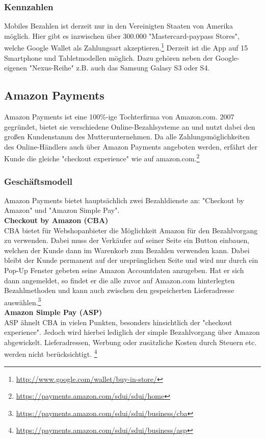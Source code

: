 \subsubsection{ Kennzahlen}
Mobiles Bezahlen ist derzeit nur in den Vereinigten Staaten von Amerika möglich. Hier gibt es inzwischen über 300.000 "Mastercard-paypass Stores", welche Google Wallet als Zahlungsart akzeptieren.\footnote{\url{http://www.google.com/wallet/buy-in-store/}}
Derzeit ist die App auf 15 Smartphone und Tabletmodellen möglich. Dazu gehören neben der Google-eigenen "Nexus-Reihe" z.B. auch das Samsung Galasy S3 oder S4. 

\subsection{Amazon Payments}
Amazon Payments ist eine 100\%-ige Tochterfirma von Amazon.com. 2007 gegründet, bietet sie verschiedene Online-Bezahlsysteme an und nutzt dabei den großen Kundenstamm des Mutterunternehmen. Da alle Zahlungsmöglichkeiten des Online-Händlers auch über Amazon Payments angeboten werden, erfährt der Kunde die gleiche "checkout experience" wie auf amazon.com.\footnote{\url{https://payments.amazon.com/sdui/sdui/home}}

\subsubsection{ Geschäftsmodell}
Amazon Payments bietet hauptsächlich zwei Bezahldienste an: "Checkout by Amazon" und "Amazon Simple Pay".\\

\textbf{Checkout by Amazon (CBA)}\\
CBA bietet für Webshopanbieter die Möglichkeit Amazon für den Bezahlvorgang zu verwenden. Dabei muss der Verkäufer auf seiner Seite ein Button einbauen, welchen der Kunde dann im Warenkorb zum Bezahlen verwenden kann. Dabei bleibt der Kunde permanent auf der ursprünglichen Seite und wird nur durch ein Pop-Up Fenster gebeten seine Amazon Accountdaten anzugeben. Hat er sich dann angemeldet, so findet er die alle zuvor auf Amazon.com hinterlegten Bezahlmethoden und kann auch zwischen den gespeicherten Lieferadresse auswählen.\footnote{\url{https://payments.amazon.com/sdui/sdui/business/cba}}\\

\textbf{Amazon Simple Pay (ASP)}\\
ASP ähnelt CBA in vielen Punkten, besonders hinsichtlich der "checkout experience". Jedoch wird hierbei lediglich der simple Bezahlvorgang über Amazon abgewickelt. Lieferadressen, Werbung oder zusätzliche Kosten durch Steuern etc. werden nicht berücksichtigt.
\footnote{\url{https://payments.amazon.com/sdui/sdui/business/asp}}\\
	
